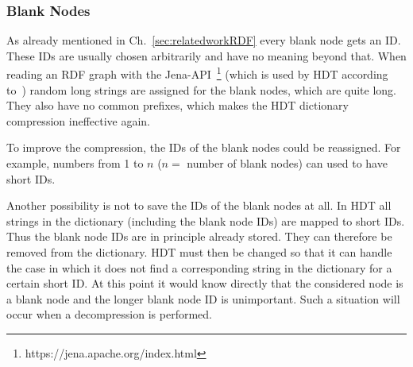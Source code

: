 \subsubsection{Blank Nodes}\label{sec:approachBlankNodes}

As already mentioned in Ch.~\ref{sec:relatedworkRDF} every blank node gets an ID. These IDs are usually chosen arbitrarily and have no meaning beyond that. When reading an RDF graph with the Jena-API~\footnote{\label{foot:5}https://jena.apache.org/index.html} (which is used by HDT according to~\cite{hdt}) random long strings are assigned for the blank nodes, which are quite long. They also have no common prefixes, which makes the HDT dictionary compression ineffective again. 

To improve the compression, the IDs of the blank nodes could be reassigned. For example, numbers from 1 to $n$ ($n=$ number of blank nodes) can used to have short IDs. 

Another possibility is not to save the IDs of the blank nodes at all. In HDT all strings in the dictionary (including the blank node IDs) are mapped to short IDs. Thus the blank node IDs are in principle already stored. They can therefore be removed from the dictionary. HDT must then be changed so that it can handle the case in which it does not find a corresponding string in the dictionary for a certain short ID. At this point it would know directly that the considered node is a blank node and the longer blank node ID is unimportant. Such a situation will occur when a decompression is performed.
















